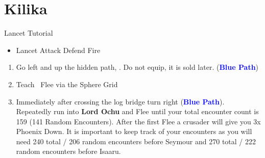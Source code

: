 \chapter{Kilika}
\begin{battle}{Lancet Tutorial}
	\begin{itemize}
		\item \sd
		      \kimahrif Lancet
		      \kimahrif Attack
		      \tidusf Defend
		      \luluf Fire
	\end{itemize}
\end{battle}
\begin{enumerate}[resume]
	\item Go left and up the hidden path, . Do not equip, it is sold later. (\textbf{\textcolor{blue}{Blue Path}})
	\item Teach \tidus\ Flee via the Sphere Grid
	\item Immediately after crossing the log bridge turn right (\textbf{\textcolor{blue}{Blue Path}}). Repeatedly run into \textbf{Lord Ochu} and Flee until your total encounter count is 159 (141 Random Encounters). After the first Flee a crusader will give you 3x Phoenix Down. It is important to keep track of your encounters as you will need 240 total / 206 random encounters before Seymour and 270 total / 222 random encounters before Isaaru.
\end{enumerate}
